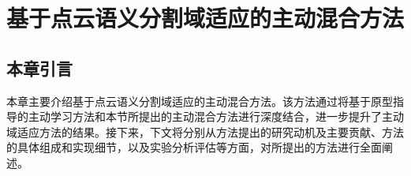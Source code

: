 \chapter{基于点云语义分割域适应的主动混合方法}
\thispagestyle{others}
\pagestyle{others}
\xiaosi

    \section{本章引言}
    本章主要介绍基于点云语义分割域适应的主动混合方法。该方法通过将基于原型指导的主动学习方法和本节所提出的主动混合方法进行深度结合，进一步提升了主动域适应方法的结果。接下来，下文将分别从方法提出的研究动机及主要贡献、方法的具体组成和实现细节，以及实验分析评估等方面，对所提出的方法进行全面阐述。 

